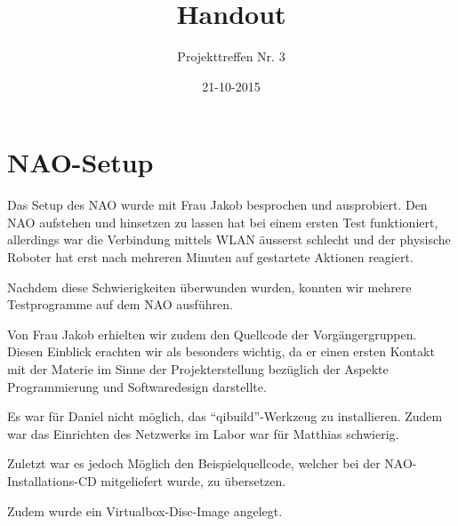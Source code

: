 \documentclass[a4paper,DIV=9,12pt]{scrreprt}
\begin{document}


\onehalfspace

\begin{titlepage}
    \title{Handout}
    \subtitle{Projekttreffen Nr. 3}
    \author{}
    \date{21-10-2015}
    \maketitle
    \thispagestyle{empty}
\end{titlepage}
\setcounter{page}{1}


\chapter{NAO-Setup}

Das Setup des NAO wurde mit Frau Jakob besprochen und ausprobiert.
Den NAO aufstehen und hinsetzen zu lassen hat bei einem ersten Test
funktioniert, allerdings war die Verbindung mittels WLAN äusserst schlecht und
der physische Roboter hat erst nach mehreren Minuten auf gestartete Aktionen
reagiert.

Nachdem diese Schwierigkeiten überwunden wurden, konnten wir mehrere
Testprogramme auf dem NAO ausführen.

Von Frau Jakob erhielten wir zudem den Quellcode der Vorgängergruppen.
Diesen Einblick erachten wir als besonders wichtig, da er einen ersten Kontakt
mit der Materie im Sinne der Projekterstellung bezüglich der Aspekte
Programmierung und Softwaredesign darstellte.

Es war für Daniel nicht möglich, das ``qibuild''-Werkzeug zu installieren.
Zudem war das Einrichten des Netzwerks im Labor war für Matthias schwierig.

Zuletzt war es jedoch Möglich den Beispielquellcode, welcher bei der
NAO-Installations-CD mitgeliefert wurde, zu übersetzen.

Zudem wurde ein Virtualbox-Disc-Image angelegt.
\end{document}
